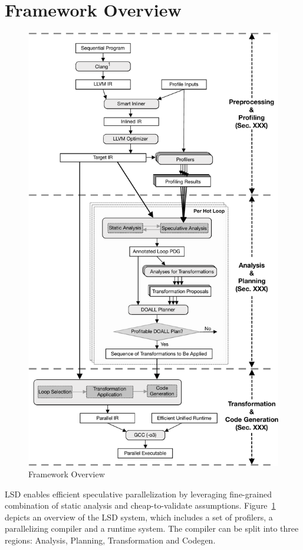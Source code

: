 \section{Framework Overview}

\begin{figure}[htp]
  \includegraphics[width=\columnwidth]{figures/compiler-pipeline-crop}
  \caption{Framework Overview}
  \label{fig:compiler-pipeline}
\end{figure}

LSD enables efficient speculative parallelization by leveraging fine-grained
combination of static analysis and cheap-to-validate assumptions.
%
Figure~\ref{fig:compiler-pipeline} depicts an overview of the LSD system, which
includes a set of profilers, a parallelizing compiler and a runtime system.
%
The compiler can be split into three regions: Analysis, Planning, Transformation
and Codegen.

